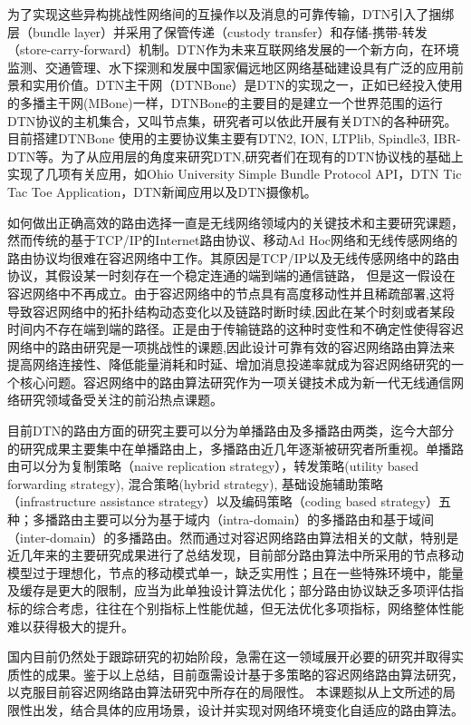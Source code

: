 \begin{introduction}
    为了实现这些异构挑战性网络间的互操作以及消息的可靠传输，DTN引入了捆绑层（bundle layer）并采用了保管传递（custody transfer）和存储-携带-转发（store-carry-forward）机制。DTN作为未来互联网络发展的一个新方向，在环境监测、交通管理、水下探测和发展中国家偏远地区网络基础建设具有广泛的应用前景和实用价值。DTN主干网（DTNBone）是DTN的实现之一，正如已经投入使用的多播主干网(MBone)一样，DTNBone的主要目的是建立一个世界范围的运行DTN协议的主机集合，又叫节点集，研究者可以依此开展有关DTN的各种研究。目前搭建DTNBone 使用的主要协议集主要有DTN2, ION, LTPlib, Spindle3, IBR-DTN等。为了从应用层的角度来研究DTN,研究者们在现有的DTN协议栈的基础上实现了几项有关应用，如Ohio University Simple Bundle Protocol API，DTN Tic Tac Toe Application，DTN新闻应用以及DTN摄像机。

如何做出正确高效的路由选择一直是无线网络领域内的关键技术和主要研究课题，然而传统的基于TCP/IP的Internet路由协议、移动Ad Hoc网络和无线传感网络的路由协议均很难在容迟网络中工作。其原因是TCP/IP以及无线传感网络中的路由协议，其假设某一时刻存在一个稳定连通的端到端的通信链路， 但是这一假设在容迟网络中不再成立。由于容迟网络中的节点具有高度移动性并且稀疏部署,这将导致容迟网络中的拓扑结构动态变化以及链路时断时续,因此在某个时刻或者某段时间内不存在端到端的路径。正是由于传输链路的这种时变性和不确定性使得容迟网络中的路由研究是一项挑战性的课题,因此设计可靠有效的容迟网络路由算法来提高网络连接性、降低能量消耗和时延、增加消息投递率就成为容迟网络研究的一个核心问题。容迟网络中的路由算法研究作为一项关键技术成为新一代无线通信网络研究领域备受关注的前沿热点课题。

    目前DTN的路由方面的研究主要可以分为单播路由及多播路由两类，迄今大部分的研究成果主要集中在单播路由上，多播路由近几年逐渐被研究者所重视。单播路由可以分为复制策略（naive replication strategy），转发策略(utility based forwarding strategy), 混合策略(hybrid strategy), 基础设施辅助策略（infrastructure assistance strategy）以及编码策略（coding based strategy）五种；多播路由主要可以分为基于域内（intra-domain）的多播路由和基于域间（inter-domain）的多播路由。然而通过对容迟网络路由算法相关的文献，特别是近几年来的主要研究成果进行了总结发现，目前部分路由算法中所采用的节点移动模型过于理想化，节点的移动模式单一，缺乏实用性；且在一些特殊环境中，能量及缓存是更大的限制，应当为此单独设计算法优化；部分路由协议缺乏多项评估指标的综合考虑，往往在个别指标上性能优越，但无法优化多项指标，网络整体性能难以获得极大的提升。 

    国内目前仍然处于跟踪研究的初始阶段，急需在这一领域展开必要的研究并取得实质性的成果。鉴于以上总结，目前亟需设计基于多策略的容迟网络路由算法研究，以克服目前容迟网络路由算法研究中所存在的局限性。 本课题拟从上文所述的局限性出发，结合具体的应用场景，设计并实现对网络环境变化自适应的路由算法。




\end{introduction}
